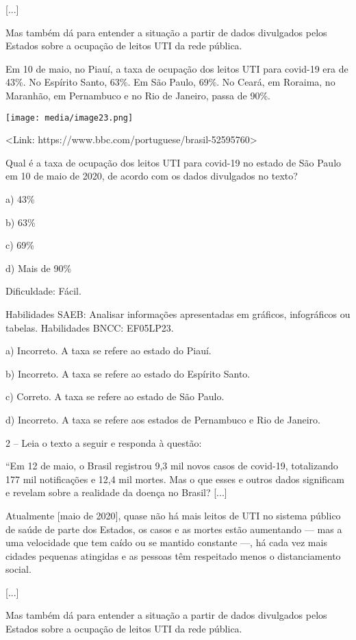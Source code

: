 {[}...{]}

Mas também dá para entender a situação a partir de dados divulgados
pelos Estados sobre a ocupação de leitos UTI da rede pública.

Em 10 de maio, no Piauí, a taxa de ocupação dos leitos UTI para covid-19
era de 43\%. No Espírito Santo, 63\%. Em São Paulo, 69\%. No Ceará, em
Roraima, no Maranhão, em Pernambuco e no Rio de Janeiro, passa de 90\%.

\texttt{[image: media/image23.png]}

\textless{}Link:
https://www.bbc.com/portuguese/brasil-52595760\textgreater{}

Qual é a taxa de ocupação dos leitos UTI para covid-19 no estado de São
Paulo em 10 de maio de 2020, de acordo com os dados divulgados no texto?

a) 43\%

b) 63\%

c) 69\%

d) Mais de 90\%

Dificuldade: Fácil.

Habilidades SAEB: Analisar informações apresentadas em gráficos,
infográficos ou tabelas. Habilidades BNCC: EF05LP23.

a) Incorreto. A taxa se refere ao estado do Piauí.

b) Incorreto. A taxa se refere ao estado do Espírito Santo.

c) Correto. A taxa se refere ao estado de São Paulo.

d) Incorreto. A taxa se refere aos estados de Pernambuco e Rio de
Janeiro.

2 -- Leia o texto a seguir e responda à questão:

``Em 12 de maio, o Brasil registrou 9,3 mil novos casos de covid-19,
totalizando 177 mil notificações e 12,4 mil mortes. Mas o que esses e
outros dados significam e revelam sobre a realidade da doença no Brasil?
{[}...{]}

Atualmente {[}maio de 2020{]}, quase não há mais leitos de UTI no
sistema público de saúde de parte dos Estados, os casos e as mortes
estão aumentando --- mas a uma velocidade que tem caído ou se mantido
constante ---, há cada vez mais cidades pequenas atingidas e as pessoas
têm respeitado menos o distanciamento social.

{[}...{]}

Mas também dá para entender a situação a partir de dados divulgados
pelos Estados sobre a ocupação de leitos UTI da rede pública.

